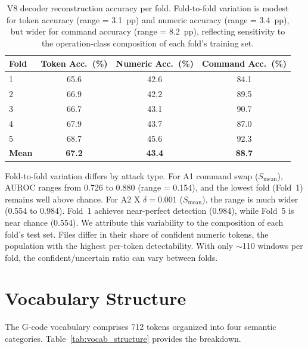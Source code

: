 \begin{table}[ht]
\centering
\caption{V8 decoder reconstruction accuracy per fold. Fold-to-fold variation is modest for token accuracy (range = 3.1~pp) and numeric accuracy (range = 3.4~pp), but wider for command accuracy (range = 8.2~pp), reflecting sensitivity to the operation-class composition of each fold's training set.}
\label{tab:perfold_v8_training}
\begin{tabular}{@{}lccc@{}}
\toprule
Fold & Token Acc.\ (\%) & Numeric Acc.\ (\%) & Command Acc.\ (\%) \\
\midrule
1 & 65.6 & 42.6 & 84.1 \\
2 & 66.9 & 42.2 & 89.5 \\
3 & 66.7 & 43.1 & 90.7 \\
4 & 67.9 & 43.7 & 87.0 \\
5 & 68.7 & 45.6 & 92.3 \\
\midrule
\textbf{Mean} & \textbf{67.2} & \textbf{43.4} & \textbf{88.7} \\
\bottomrule
\end{tabular}
\end{table}

Fold-to-fold variation differs by attack type.
For A1 command swap ($S_{\text{mean}}$), AUROC ranges from 0.726 to 0.880 (range = 0.154), and the lowest fold (Fold~1) remains well above chance.
For A2 X $\delta = 0.001$ ($S_{\text{mean}}$), the range is much wider (0.554 to 0.984).
Fold~1 achieves near-perfect detection (0.984), while Fold~5 is near chance (0.554).
We attribute this variability to the composition of each fold's test set.
Files differ in their share of confident numeric tokens, the population with the highest per-token detectability.
With only $\sim$110 windows per fold, the confident/uncertain ratio can vary between folds.

\section{Vocabulary Structure}
\label{app:vocab}

The G-code vocabulary comprises 712 tokens organized into four semantic categories.
Table~\ref{tab:vocab_structure} provides the breakdown.

